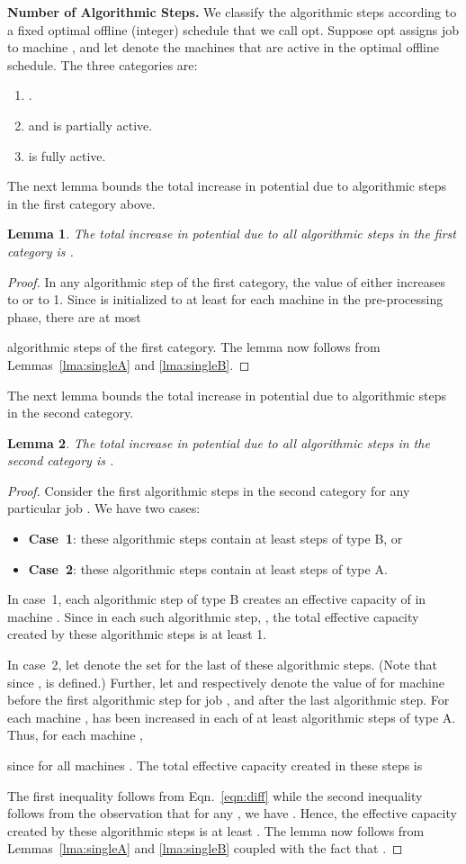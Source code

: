 \documentclass[11pt]{article}
\newtheorem{lemma}{Lemma}
\begin{document}
\noindent
{\bf Number of Algorithmic Steps.}
We classify the algorithmic steps according to a fixed 
optimal offline (integer) schedule that we call {\sc opt}. Suppose {\sc opt}
assigns job  to machine , and let  denote the machines
that are active in the optimal offline schedule. The three categories are:
\begin{enumerate}
\item .
\item  and  is partially active.
\item  is fully active.
\end{enumerate}
The next lemma bounds the total increase in potential due to algorithmic 
steps in the first category above.
\begin{lemma}
\label{lma:category1}
The total increase in potential due to all algorithmic steps in the first 
category is .
\end{lemma}
\begin{proof}
In any algorithmic step of the first category, the value of 
either increases to  or to 1. 
Since  is initialized
to at least  for each machine  in the pre-processing phase, 
there are at most 
 
algorithmic steps of the first category.
The lemma now follows from Lemmas~\ref{lma:singleA} and \ref{lma:singleB}.
\end{proof}
\noindent
The next lemma bounds the total increase in potential due to algorithmic 
steps in the second category.
\begin{lemma}
\label{lma:category2}
The total increase in potential due to all algorithmic steps in the second 
category is .
\end{lemma}
\begin{proof}
Consider the first  algorithmic steps in the second category for any 
particular job . We have two cases: 
\begin{itemize}
\item {\bf Case~1}: these
algorithmic steps contain at least  steps of 
type B, or
\item {\bf Case~2}: these algorithmic steps contain at least
 steps of type A.
\end{itemize} 
In case~1, each algorithmic step of type B creates an effective capacity
of  in machine . Since in each such algorithmic
step, ,
the total effective capacity created by these algorithmic steps is 
at least 1.

In case~2, let  denote the set  
for the last of these algorithmic steps. (Note that since 
,  is defined.) Further, let  and
 respectively denote 
the value of  for machine  before the first
algorithmic step for job , and after the last
algorithmic step. For each machine ,  has been increased in 
each of at least  algorithmic steps of type A. Thus, for each 
machine ,

since  for all machines . The 
total effective capacity created in these steps is 

The first inequality follows from Eqn.~\ref{eqn:diff} while the 
second inequality follows from the observation that for any ,
we have
.
Hence, the effective capacity created by these algorithmic steps is at least
. The lemma now follows from
Lemmas~\ref{lma:singleA} and \ref{lma:singleB} coupled with the fact that
.
\end{proof}
\end{document}

